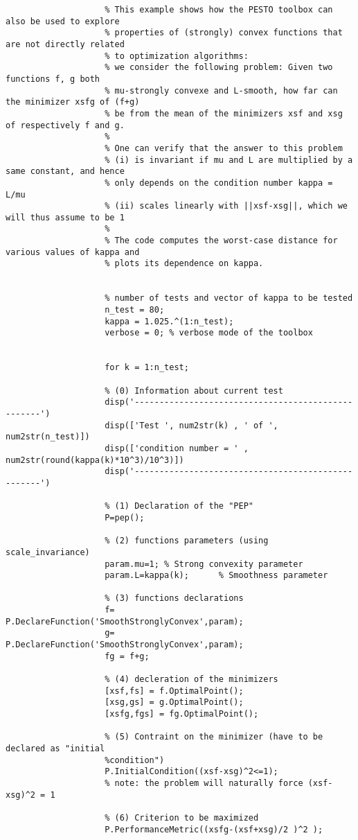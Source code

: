 \documentclass[11pt,a4paper]{article}
\begin{document}
					\begin{lstlisting}
					% This example shows how the PESTO toolbox can also be used to explore
					% properties of (strongly) convex functions that are not directly related
					% to optimization algorithms:
					% we consider the following problem: Given two functions f, g both
					% mu-strongly convexe and L-smooth, how far can the minimizer xsfg of (f+g) 
					% be from the mean of the minimizers xsf and xsg of respectively f and g. 
					%
					% One can verify that the answer to this problem 
					% (i) is invariant if mu and L are multiplied by a same constant, and hence
					% only depends on the condition number kappa = L/mu
					% (ii) scales linearly with ||xsf-xsg||, which we will thus assume to be 1
					%
					% The code computes the worst-case distance for various values of kappa and
					% plots its dependence on kappa.
					
					
					% number of tests and vector of kappa to be tested
					n_test = 80;
					kappa = 1.025.^(1:n_test);
					verbose = 0; % verbose mode of the toolbox
					
					
					for k = 1:n_test;
					
					% (0) Information about current test    
					disp('---------------------------------------------------')
					disp(['Test ', num2str(k) , ' of ', num2str(n_test)])
					disp(['condition number = ' , num2str(round(kappa(k)*10^3)/10^3)])
					disp('---------------------------------------------------')
					
					% (1) Declaration of the "PEP"
					P=pep();
					
					% (2) functions parameters (using scale_invariance)
					param.mu=1;	% Strong convexity parameter
					param.L=kappa(k);      % Smoothness parameter
					
					% (3) functions declarations
					f= P.DeclareFunction('SmoothStronglyConvex',param);
					g= P.DeclareFunction('SmoothStronglyConvex',param);
					fg = f+g;
					
					% (4) decleration of the minimizers
					[xsf,fs] = f.OptimalPoint();
					[xsg,gs] = g.OptimalPoint();
					[xsfg,fgs] = fg.OptimalPoint();
					
					% (5) Contraint on the minimizer (have to be declared as "initial
					%condition")
					P.InitialCondition((xsf-xsg)^2<=1);
					% note: the problem will naturally force (xsf-xsg)^2 = 1
					
					% (6) Criterion to be maximized
					P.PerformanceMetric((xsfg-(xsf+xsg)/2 )^2 ); 
					

\end{lstlisting}
\end{document}
